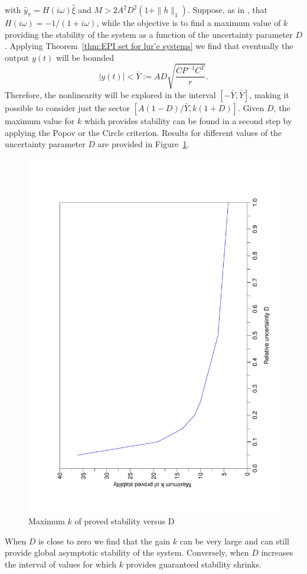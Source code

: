 \documentclass[letterpaper,10pt,conference,twocolumn]{IEEEtran}
\newcommand{\csi}{\xi}
\newcommand{\w}{\omega}
\begin{document}
with $\hat y_{\pi}=H(i\w)\hat \csi$ and $M>2A^2D^2(1+\|h\|_1)$.
Suppose, as in \cite{MegRan97}, that $H(i\w)=-1/(1+i\w)$,
while the objective is to find a maximum value of $k$ providing the stability of the system as a function of the uncertainty parameter $D$.
Applying Theorem~\ref{thm:EPI set for lur'e systems} we find that eventually the output $y(t)$ will be bounded
\begin{equation*}
	|y(t)|< \overline Y := A D \sqrt{\frac{CP^{-1}C^T}{r}}.
\end{equation*}
Therefore, the nonlinearity will be explored in the interval $[-\bar Y, \bar Y]$, making it possible to consider just the sector $[ A(1-D)/\bar Y , k(1+D)]$.
Given $D$, the maximum value for $k$ which provides stability can be found in a second step by applying the Popov or the Circle criterion.
Results for different values of the uncertainty parameter $D$ are provided in Figure~\ref{fig:maxkversusD}.
\begin{figure}
	\centering
	\includegraphics[width=0.75\columnwidth, angle=-90]{MaxKversusD}
	\caption{Maximum $k$ of proved stability versus D
		\label{fig:maxkversusD}}
\end{figure}
When $D$ is close to zero we find that the gain $k$ can be very large and can still provide global asymptotic stability of the system. Conversely, when $D$ increases the interval of values for which $k$ provides guaranteed stability shrinks.
\end{document}
